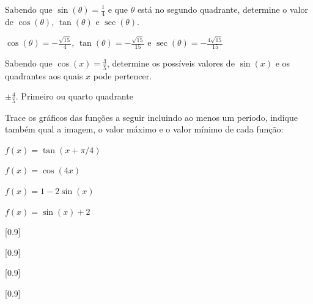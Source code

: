 \begin{exercises*}
\begin{exercise}
  Sabendo que $\sin(\theta)=\frac{1}{4}$ e que $\theta$ está no segundo
  quadrante, determine o valor de $\cos(\theta)$, $\tan(\theta)$ e
  $\sec(\theta)$.

  \begin{answer}
    $\cos(\theta)= -\frac{\sqrt{15}}{4}$, $\tan(\theta)=
    -\frac{\sqrt{15}}{15}$ e $\sec(\theta)=-\frac{4\sqrt{15}}{15}$
  \end{answer}
\end{exercise}

\begin{exercise}
  Sabendo que $\cos(x)= \frac{3}{5}$, determine os possíveis valores de
  $\sin(x)$ e os quadrantes aos quais $x$ pode pertencer.

  \begin{answer}
    $\pm\frac{4}{5} $. Primeiro ou quarto quadrante
  \end{answer}
\end{exercise}

\begin{exercise}
  Trace os gráficos das funções a seguir incluindo ao menos um período,
  indique também qual a imagem, o valor máximo e o valor mínimo de cada
  função:
  \begin{alphalist}
    \item $f(x)=\tan(x+\pi/4)$
    \item $f(x)=\cos(4x)$
    \item $f(x)=1-2\sin (x)$
    \item $f(x)=\sin(x)+2$
  \end{alphalist}

  \begin{answer}
    \begin{alphalist}
      \item {}[0.9]
      \item {}[0.9]
      \item {}[0.9]
      \item {}[0.9]
    \end{alphalist}
  \end{answer}
\end{exercise}


\end{exercises*}
